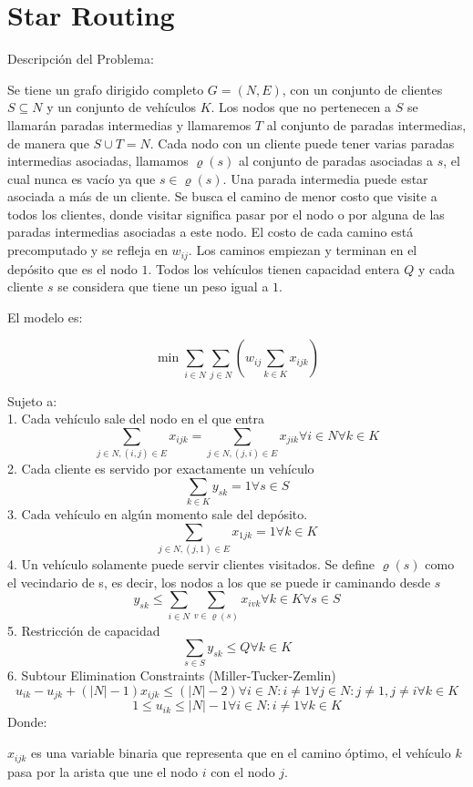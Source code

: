 \section{Star Routing}

Descripción del Problema:

Se tiene un grafo dirigido completo $G = (N, E)$, con un conjunto de clientes $S \subseteq N$ y un conjunto de vehículos $K$. Los nodos que no pertenecen a $S$ se llamarán paradas intermedias y llamaremos $T$ al conjunto de paradas intermedias, de manera que $S \cup T = N$. Cada nodo con un cliente puede tener varias paradas intermedias asociadas, llamamos $\varrho(s)$ al conjunto de paradas asociadas a $s$, el cual nunca es vacío ya que $s \in \varrho(s)$. Una parada intermedia puede estar asociada a más de un cliente. Se busca el camino de menor costo que visite a todos los clientes, donde visitar significa pasar por el nodo o por alguna de las paradas intermedias asociadas a este nodo. El costo de cada camino está precomputado y se refleja en $w_{ij}$. Los caminos empiezan y terminan en el depósito que es el nodo $1$. Todos los vehículos tienen capacidad entera $Q$ y cada cliente $s$ se considera que tiene un peso igual a $1$. 

El modelo es:

\[\min \sum_{i \in N} \sum_{j \in N} (w_{ij} \sum_{k \in K} x_{ijk})\]

Sujeto a:
\\
1. Cada vehículo sale del nodo en el que entra
\[
\sum_{j \in N, (i, j) \in E}{x_{ijk}} = \sum_{j \in N, (j, i) \in E}{x_{jik}}
\forall {i \in N} \forall {k \in K}
\]
2. Cada cliente es servido por exactamente un vehículo
\[
\sum_{k \in K} y_{sk} = 1
\forall {s \in S} 
\]
3. Cada vehículo en algún momento sale del depósito.
\[
\sum_{j \in N, (j, 1) \in E}{x_{1jk}} = 1
\forall {k \in K} 
\]
4. Un vehículo solamente puede servir clientes visitados.
Se define $\varrho(s)$ como el vecindario de s, es decir, los nodos a los que se puede ir caminando desde $s$ 
\[
y_{sk} \leq \sum_{i \in N}\sum_{v \in \varrho(s)}{x_{i v k}}
\forall {k \in K} \forall {s \in S} 
\]
5. Restricción de capacidad
\[
\sum_{s \in S}{y_{sk}} \le Q
\forall {k \in K}  
\]
6. Subtour Elimination Constraints (Miller-Tucker-Zemlin)
\[
u_{ik} - u_{jk} + (|N| - 1)x_{ijk} \leq (|N| - 2) 
\forall {i \in N : i \neq 1} \forall {j \in N : j \neq 1, j \neq i} \forall {k \in K}
\]
\[
1 \leq u_{ik} \leq |N| - 1 
\forall {i \in N : i \neq 1} \forall {k \in K}
\]
Donde:

$x_{ijk}$ es una variable binaria que representa que en el camino óptimo, el vehículo $k$ pasa por la arista que une el nodo $i$ con el nodo $j$.  

